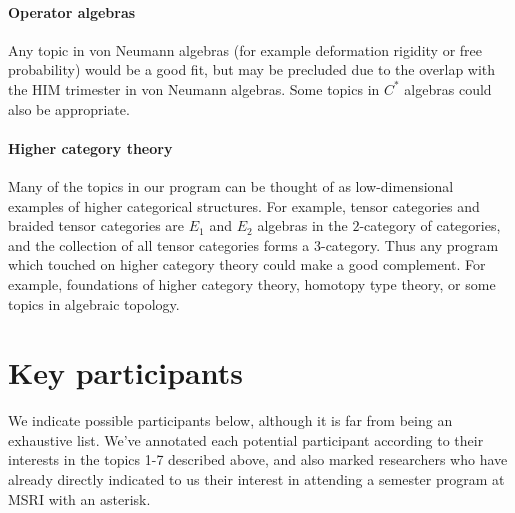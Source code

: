 \documentclass[12pt]{article}
\begin{document}
\paragraph{Operator algebras}
Any topic in von Neumann algebras (for example deformation rigidity or free probability) would be a good fit, but may be precluded due to the overlap with the HIM trimester in von Neumann algebras.  Some topics in $C^*$ algebras could also be appropriate.

\paragraph{Higher category theory}
Many of the topics in our program can be thought of as low-dimensional examples of higher categorical structures.  For example, tensor categories and braided tensor categories are $E_1$ and $E_2$ algebras in the $2$-category of categories, and the collection of all tensor categories forms a $3$-category.  Thus any program which touched on higher category theory could make a good complement.  For example, foundations of higher category theory, homotopy type theory, or some topics in algebraic topology.


\section{Key participants}
We indicate possible participants below, although it is far from being an exhaustive list. We've annotated each potential participant according to their interests in the topics 1-7 described above, and also marked researchers who have already directly indicated to us their interest in attending a semester program at MSRI with an asterisk.
\end{document}
